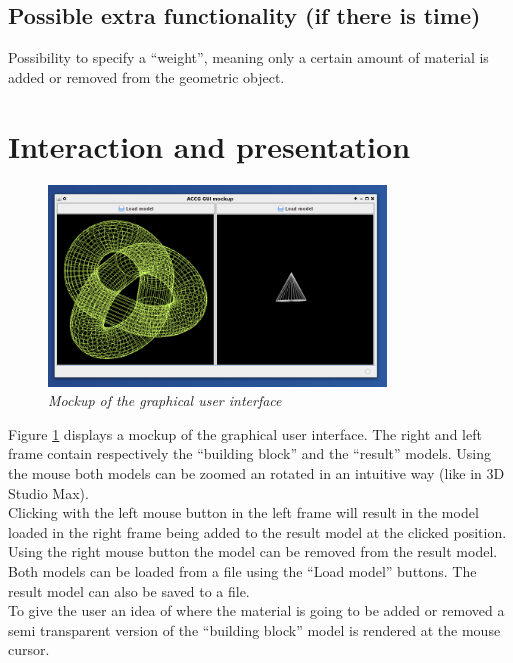 \documentclass[10pt]{report}
\begin{document}
\subsection{Possible extra functionality (if there is time)}
Possibility to specify a ``weight'', meaning only a certain amount of material is added or removed from the geometric object.

\section{Interaction and presentation}

\begin{figure}[h]
\centering
\includegraphics[width = 0.8\textwidth]{../resources/gui_mockup/1}
\caption{\emph{Mockup of the graphical user interface}} \label{gui_mockup}
\end{figure}

Figure \ref{gui_mockup} displays a mockup of the graphical user interface. The right and left frame contain respectively the ``building block'' and the ``result'' models. Using the mouse both models can be zoomed an rotated in an intuitive way (like in 3D Studio Max).\\

Clicking with the left mouse button in the left frame will result in the model loaded in the right frame being added to the result model at the clicked position. Using the right mouse button the model can be removed from the result model. \\

Both models can be loaded from a file using the ``Load model'' buttons. The result model can also be saved to a file. \\

To give the user an idea of where the material is going to be added or removed a semi transparent version of the ``building block'' model is rendered at the mouse cursor. \\
\end{document}
